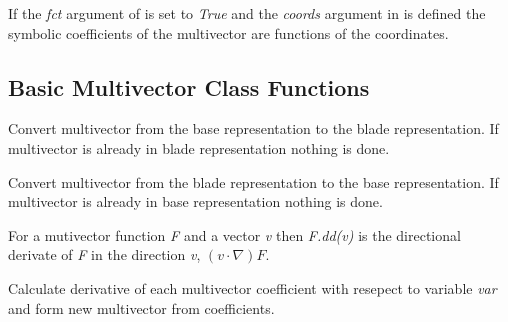 \documentclass[letterpaper,10pt,english]{sphinxmanual}
\begin{document}
\begin{fulllineitems}
If the \emph{fct} argument of {\hyperref[GA:MV]{}} is set to \emph{True} and the \emph{coords} argument in
{\hyperref[GA:MV.setup]{}} is defined the symbolic coefficients of the multivector are functions
of the coordinates.

\end{fulllineitems}



\subsection{Basic Multivector Class Functions}
\label{GA:basic-multivector-class-functions}

\begin{fulllineitems}
\label{GA:convert_to_blades}
Convert multivector from the base representation to the blade representation.
If multivector is already in blade representation nothing is done.

\end{fulllineitems}


\begin{fulllineitems}
\label{GA:convert_from_blades}
Convert multivector from the blade representation to the base representation.
If multivector is already in base representation nothing is done.

\end{fulllineitems}


\begin{fulllineitems}
\label{GA:dd}
For a mutivector function \emph{F} and a vector \emph{v} then \emph{F.dd(v)} is the
directional derivate of \emph{F} in the direction \emph{v}, $( v\cdot\nabla ) F$.

\end{fulllineitems}


\begin{fulllineitems}
\label{GA:diff}
Calculate derivative of each multivector coefficient with resepect to
variable \emph{var} and form new multivector from coefficients.

\end{fulllineitems}
\end{document}
